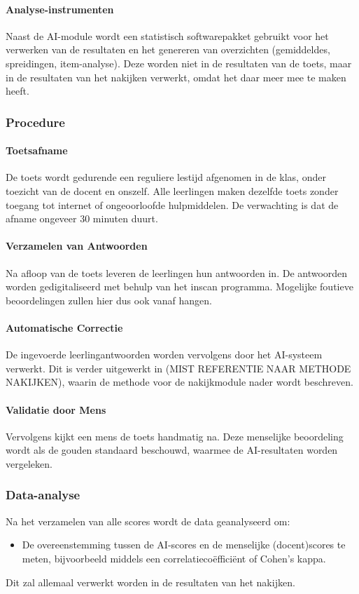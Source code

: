 \documentclass[12pt]{article}
\begin{document}
\paragraph{Analyse-instrumenten} 
Naast de AI-module wordt een statistisch softwarepakket gebruikt voor het verwerken van de resultaten en het genereren van overzichten (gemiddeldes, spreidingen, item-analyse). Deze worden niet in de resultaten van de toets, maar in de resultaten van het nakijken verwerkt, omdat het daar meer mee te maken heeft.

\subsubsection*{Procedure}

\paragraph{Toetsafname} 
De toets wordt gedurende een reguliere lestijd afgenomen in de klas, onder toezicht van de docent en onszelf. Alle leerlingen maken dezelfde toets zonder toegang tot internet of ongeoorloofde hulpmiddelen. De verwachting is dat de afname ongeveer 30 minuten duurt.

\paragraph{Verzamelen van Antwoorden} 
Na afloop van de toets leveren de leerlingen hun antwoorden in. De antwoorden worden gedigitaliseerd met behulp van het inscan programma. Mogelijke foutieve beoordelingen zullen hier dus ook vanaf hangen.

\paragraph{Automatische Correctie} 
De ingevoerde leerlingantwoorden worden vervolgens door het AI-systeem verwerkt. Dit is verder uitgewerkt in (MIST REFERENTIE NAAR METHODE NAKIJKEN), waarin de methode voor de nakijkmodule nader wordt beschreven.


\paragraph{Validatie door Mens} 
Vervolgens kijkt een mens de toets handmatig na. Deze menselijke beoordeling wordt als de gouden standaard beschouwd, waarmee de AI-resultaten worden vergeleken.

\subsubsection*{Data-analyse}
Na het verzamelen van alle scores wordt de data geanalyseerd om:
\begin{itemize}
    \item De overeenstemming tussen de AI-scores en de menselijke (docent)scores te meten, bijvoorbeeld middels een correlatiecoëfficiënt of Cohen’s kappa.
\end{itemize}
Dit zal allemaal verwerkt worden in de resultaten van het nakijken.
\end{document}
